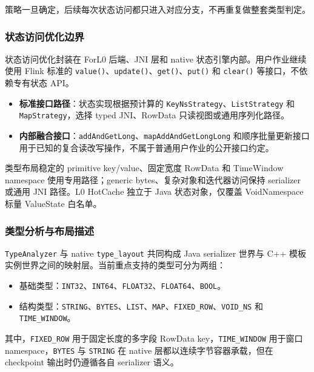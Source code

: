 \documentclass[a4paper,11pt]{article}
\begin{document}
策略一旦确定，后续每次状态访问都只进入对应分支，不再重复做整套类型判定。

\subsubsection{状态访问优化边界}

状态访问优化封装在 ForL0 后端、JNI 层和 native 状态引擎内部。用户作业继续使用 Flink 标准的 \texttt{value()}、\texttt{update()}、\texttt{get()}、\texttt{put()} 和 \texttt{clear()} 等接口，不依赖专有状态 API。

\begin{itemize}
  \item \textbf{标准接口路径}：状态实现根据预计算的 \texttt{KeyNsStrategy}、\texttt{ListStrategy} 和 \texttt{MapStrategy}，选择 typed JNI、RowData 只读视图或通用序列化路径。
  \item \textbf{内部融合接口}：\texttt{addAndGetLong}、\texttt{mapAddAndGetLongLong} 和顺序批量更新接口用于已知的复合读改写操作，不属于普通用户作业的公开接口约定。
\end{itemize}

类型布局稳定的 primitive key/value、固定宽度 RowData 和 TimeWindow namespace 使用专用路径；generic bytes、复杂对象和迭代器访问保持 serializer 或通用 JNI 路径。L0 HotCache 独立于 Java 状态对象，仅覆盖 VoidNamespace 标量 ValueState 白名单。

\subsubsection{类型分析与布局描述}

\texttt{TypeAnalyzer} 与 native \texttt{type\_layout} 共同构成 Java serializer 世界与 C++ 模板实例世界之间的映射层。当前重点支持的类型可分为两组：

\begin{itemize}
  \item 基础类型：\texttt{INT32}、\texttt{INT64}、\texttt{FLOAT32}、\texttt{FLOAT64}、\texttt{BOOL}。
  \item 结构类型：\texttt{STRING}、\texttt{BYTES}、\texttt{LIST}、\texttt{MAP}、\texttt{FIXED\_ROW}、\texttt{VOID\_NS} 和 \texttt{TIME\_WINDOW}。
\end{itemize}

其中，\texttt{FIXED\_ROW} 用于固定长度的多字段 RowData key，\texttt{TIME\_WINDOW} 用于窗口 namespace，\texttt{BYTES} 与 \texttt{STRING} 在 native 层都以连续字节容器承载，但在 checkpoint 输出时仍遵循各自 serializer 语义。
\end{document}
